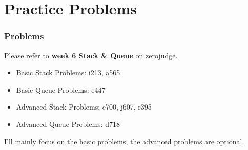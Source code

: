 \documentclass[xcolor=dvipsnames]{beamer}
\begin{document}
    \section{Practice Problems}
    \begin{frame}
        \frametitle{Problems}
        Please refer to \textbf{week 6 Stack \& Queue} on zerojudge.
        \begin{itemize}
            \item Basic Stack Problems: i213, a565
            \item Basic Queue Problems: e447
            \item Advanced Stack Problems: c700, j607, r395
            \item Advanced Queue Problems: d718
        \end{itemize}
        I'll mainly focus on the basic problems, the advanced problems are optional.
    \end{frame}
\end{document}

